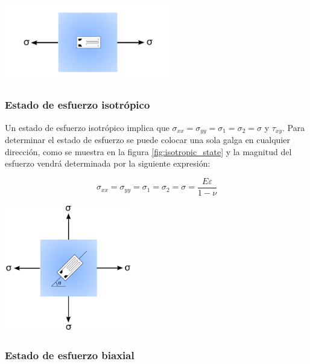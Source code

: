 \begin{center}
\includegraphics[width=0.55\textwidth]{src/ch2/uniaxial_state.pdf}
\label{fig:uniaxial_state}
\end{center}

\subsubsection*{Estado de esfuerzo isotrópico}

Un estado de esfuerzo isotrópico implica que $\sigma_{xx} = \sigma_{yy} = \sigma_1 = \sigma_2 = \sigma$ y 
$\tau_{xy}$. Para determinar el estado de esfuerzo se puede colocar una sola galga en cualquier dirección, 
como se muestra en la figura \ref{fig:isotropic_state} y la magnitud del esfuerzo vendrá 
determinada por la siguiente expresión:

\begin{equation}
\sigma_{xx} = \sigma_{yy} = \sigma_1 = \sigma_2 = \sigma = \frac{E\varepsilon}{1-\nu}
\end{equation}

\begin{center}
\includegraphics[width=0.42\textwidth]{src/ch2/isotropic_state.pdf}
\label{fig:isotropic_state}
\end{center}

\subsubsection*{Estado de esfuerzo biaxial}

